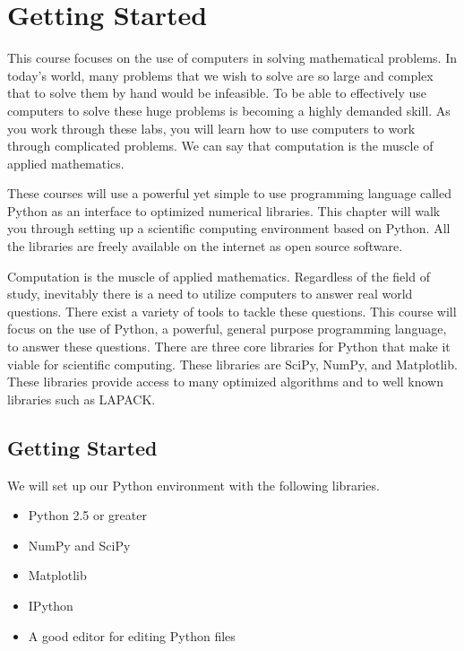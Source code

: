 \setcounter{chapter}{-1}
\chapter{Getting Started}


This course focuses on the use of computers in solving mathematical problems.  In today's world, many problems that we wish to solve are so large and complex that to solve them by hand would be infeasible.  To be able to effectively use computers to solve these huge problems is becoming a highly demanded skill.  As you work through these labs, you will learn how to use computers to work through complicated problems.  We can say that computation is the muscle of applied mathematics.

These courses will use a powerful yet simple to use programming language called Python as an interface to optimized numerical libraries.  This chapter will walk you through setting up a scientific computing environment based on Python.  All the libraries are freely available on the internet as open source software.

Computation is the muscle of applied mathematics. Regardless of the field of study, inevitably there is a need to utilize computers to answer real world questions.  There exist a variety of tools to tackle these questions.  This course will focus on the use of Python, a powerful, general purpose programming language, to answer these questions.  There are three core libraries for Python that make it viable for scientific computing.  These libraries are SciPy, NumPy, and Matplotlib.  These libraries provide access to many optimized algorithms and to well known libraries such as LAPACK.

\section*{Getting Started}
We will set up our Python environment with the following libraries.
\begin{itemize}
\item Python 2.5 or greater
\item NumPy and SciPy
\item Matplotlib
\item IPython
\item A good editor for editing Python files
\end{itemize}

